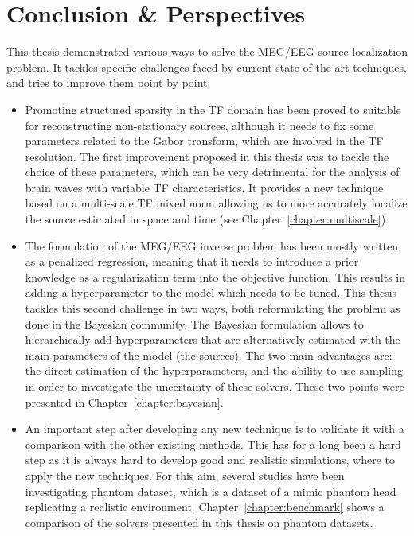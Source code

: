 
\chapter{Conclusion \& Perspectives}
\label{chapter:conclusion}

This thesis demonstrated various ways to solve the MEG/EEG source localization problem. It tackles specific challenges faced by current state-of-the-art techniques, and tries to improve them point by point:
\begin{itemize}
\item Promoting structured sparsity in the TF domain has been proved to suitable for reconstructing non-stationary sources, although it needs to fix some parameters related to the Gabor transform, which are involved in the TF resolution. The first improvement proposed in this thesis was to tackle the choice of these parameters, which can be very detrimental for the analysis of brain waves with variable TF characteristics. It provides a new technique based on a multi-scale TF mixed norm allowing us to more accurately localize the source estimated in space and time (see Chapter~\ref{chapter:multiscale}).

\item The formulation of the MEG/EEG inverse problem has been mostly written as a penalized regression, meaning that it needs to introduce a prior knowledge as a regularization term into the objective function. This results in adding a hyperparameter to the model which needs to be tuned. This thesis tackles this second challenge in two ways, both reformulating the problem as done in the Bayesian community. The Bayesian formulation allows to hierarchically add hyperparameters that are alternatively estimated with the main parameters of the model (the sources). The two main advantages are: the direct estimation of the hyperparameters, and the ability to use sampling in order to investigate the uncertainty of these solvers. These two points were presented in Chapter~\ref{chapter:bayesian}.

\item An important step after developing any new technique is to validate it with a comparison with the other existing methods. This has for a long been a hard step as it is always hard to develop good and realistic simulations, where to apply the new techniques. For this aim, several studies have been investigating phantom dataset, which is a dataset of a mimic phantom head replicating a realistic environment. Chapter~\ref{chapter:benchmark} shows a comparison of the solvers presented in this thesis on phantom datasets.
\end{itemize}

